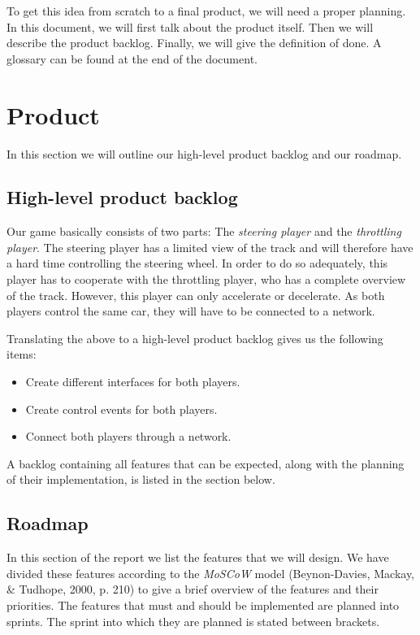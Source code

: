 \documentclass[11pt,twoside,a4paper]{article}
\begin{document}
To get this idea from scratch to a final product, we will need a proper planning. In this document, we will first talk about the product itself. Then we will describe the product backlog. Finally, we will give the definition of done. A glossary can be found at the end of the document.


\section{Product}

In this section we will outline our high-level product backlog and our roadmap.


\subsection{High-level product backlog}
Our game basically consists of two parts: The \emph{steering player} and the \emph{throttling player}. The steering player has a limited view of the track and will therefore have a hard time controlling the steering wheel. In order to do so adequately, this player has to cooperate with the throttling player, who has a complete overview of the track. However, this player can only accelerate or decelerate. As both players control the same car, they will have to be connected to a network.

Translating the above to a high-level product backlog gives us the following items:

\begin{itemize}
	\item Create different interfaces for both players.
	\item Create control events for both players.
	\item Connect both players through a network.
\end{itemize}

A backlog containing all features that can be expected, along with the planning of their implementation, is listed in the section below.


\newpage

\subsection{Roadmap}
In this section of the report we list the features that we will design. We have divided these features according to the \emph{MoSCoW} model (Beynon-Davies, Mackay, \& Tudhope, 2000, p. 210) to give a brief overview of the features and their priorities. The features that must and should be implemented are planned into sprints. The sprint into which they are planned is stated between brackets.
\end{document}

